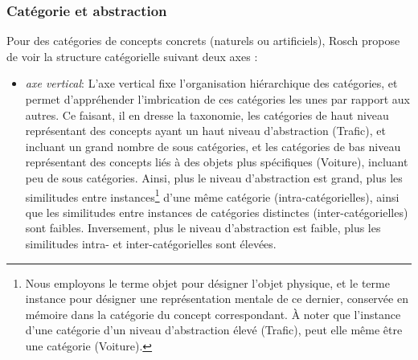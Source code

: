 \subsubsection{Catégorie et abstraction}
 \label{sec:ch3_categoEtAbstract}
 
Pour des catégories de concepts concrets (naturels ou artificiels), Rosch propose de voir la structure catégorielle suivant deux axes \citep[p. 30-41]{rosch1978cognition}:

\begin{itemize}
\item \textit{axe vertical}: L'axe vertical fixe l'organisation hiérarchique des catégories, et permet d'appréhender l'imbrication de ces catégories les unes par rapport aux autres. Ce faisant, il en dresse la taxonomie, les catégories de haut niveau représentant des concepts ayant un haut niveau d'abstraction (Trafic), et incluant un grand nombre de sous catégories, et les catégories de bas niveau représentant des concepts liés à des objets plus spécifiques (Voiture), incluant peu de sous catégories. Ainsi, plus le niveau d'abstraction est grand, plus les similitudes entre instances\footnote{Nous employons le terme objet pour désigner l'objet physique, et le terme instance pour désigner une représentation mentale de ce dernier, conservée en mémoire dans la catégorie du concept correspondant. À noter que l'instance d'une catégorie d'un niveau d'abstraction élevé (Trafic), peut elle même être une catégorie (Voiture).} d'une même catégorie (intra-catégorielles), ainsi que les similitudes entre instances de catégories distinctes (inter-catégorielles) sont faibles. Inversement, plus le niveau d'abstraction est faible, plus les similitudes intra- et inter-catégorielles sont élevées. 

\end{itemize}
